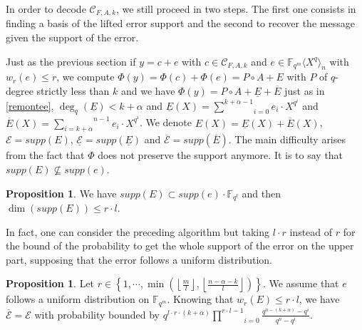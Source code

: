 \documentclass{article}
\newcommand{\tmop}[1]{#1}          %
\theoremstyle{definition}
\newtheorem{proposition}[theorem]{Proposition}
\begin{document}
In order to decode $\mathcal{C}_{F, A, k}$, we still proceed in two steps.
The first one consists in finding a basis of the lifted error support and the second
to recover the message given the support of the error.

Just as the previous section if $y = c + e$ with $c \in \mathcal{C}_{F, A,
            k}$ and $e \in \mathbb{F}_{q^m} \langle X^q \rangle_n$ with $w_r(e)
      \leqslant r$, we compute $\Phi (y) = \Phi (c) + \Phi (e) = P \circ A + E$ with
$P$ of $q$-degree strictly less than $k$ and we have $\Phi (y) = P \circ A +
      \underline{E} + \overline{E}$ just as in \ref{remontee}, $\deg_q \left(
      \underline{E} \right) < k+\alpha$ and $\underline{E} (X) = \underset{i =
            0}{\overset{k+\alpha - 1}{\sum}} e_i \cdot X^{q^i}$ and $\overline{E} (X) =
      \overset{n - 1}{\underset{i = k +\alpha}{\sum}} e_i \cdot X^{q^i}$. We denote $E (X) =
      \underline{E} (X) + \overline{E} (X)$, $\mathcal{E}= \tmop{supp} (E)$,
$\underline{\mathcal{E}} = \tmop{supp} \left( \underline{E} \right)$ and
$\overline{\mathcal{E}} = \tmop{supp} \left( \overline{E} \right)$. The main
difficulty arises from the fact that $\Phi$ does not preserve the support
anymore. It is to say that $\tmop{supp} (E)\nsubseteq \tmop{supp} (e)$.

\begin{proposition}
      We have $\tmop{supp} (E) \subset \tmop{supp} (e) \cdot \mathbb{F}_{q^l}$ and
      then $\dim (\tmop{supp} (E)) \leqslant r \cdot l$.
\end{proposition}

In fact, one can consider the preceding algorithm but taking $l \cdot r$
instead of $r$ for the bound of the probability to get  the whole support of
the error on the upper part, supposing that the error follows a uniform distribution.\color{black}

\begin{proposition}
      Let $r \in \left\{ 1, \cdots, \min \left( \left\lfloor \frac{m}{l}
            \right\rfloor, \left\lfloor \frac{n - \alpha - k}{l} \right\rfloor \right)
            \right\}$. We assume that $e$ follows a uniform distribution on
      $\mathbb{F}_{q^m}$. Knowing that $w_r (E) \leqslant r \cdot l$, we have
      $\overline{\mathcal{E}} =\mathcal{E}$ with probability bounded by $q^{l \cdot r \cdot
                        (k+ \alpha)} \underset{i = 0}{\overset{r \cdot l - 1}{\prod}} \frac{q^{n -(k+ \alpha)} -
                  q^i}{q^n - q^i}$.
\end{proposition}
\end{document}
